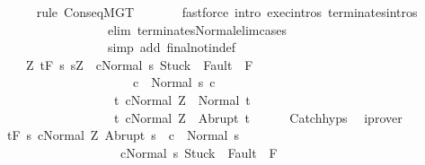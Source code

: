 \begin{isabellebody}
\ \ \ \ \isamarkupfalse%
\ {\isacharparenleft}rule\ ConseqMGT{\isacharparenright}\isanewline
\ \ \ \ \ \ \ {\isacharparenleft}fastforce\ intro{\isacharcolon}\ exec{\isachardot}intros\ terminates{\isachardot}intros\ \isanewline
\ \ \ \ \ \ \ \ \ \ \ \ \ \ \ \ \ elim{\isacharcolon}\ terminates{\isacharunderscore}Normal{\isacharunderscore}elim{\isacharunderscore}cases\isanewline
\ \ \ \ \ \ \ \ \ \ \ \ \ \ \ \ \ simp\ add{\isacharcolon}\ final{\isacharunderscore}notin{\isacharunderscore}def{\isacharparenright}\isanewline
\ \ \isamarkupfalse%
\isanewline
\ \ \isamarkupfalse%
\ \isanewline
\ \ \ \ {\isachardoublequoteopen}{\isasymforall}Z{\isachardot}\ {\isasymGamma}{\isacharcomma}{\isasymTheta}{\isasymturnstile}\isactrlsub t\isactrlbsub {\isacharslash}F\isactrlesub \ {\isacharbraceleft}s{\isachardot}\ s{\isacharequal}Z\ {\isasymand}\ {\isasymGamma}{\isasymturnstile}{\isasymlangle}cNormal\ s{\isasymrangle}\ {\isasymRightarrow}{\isasymnotin}{\isacharparenleft}{\isacharbraceleft}Stuck{\isacharbraceright}\ {\isasymunion}\ Fault\ {\isacharbackquote}\ {\isacharparenleft}{\isacharminus}F{\isacharparenright}{\isacharparenright}\ {\isasymand}\ \isanewline
\ \ \ \ \ \ \ \ \ \ \ \ \ \ \ \ \ \ \ \ \ {\isasymGamma}{\isasymturnstile}c\ {\isasymdown}\ Normal\ s{\isacharbraceright}\ c\isanewline
\ \ \ \ \ \ \ \ \ \ \ \ \ \ \ \ \ \ {\isacharbraceleft}t{\isachardot}\ {\isasymGamma}{\isasymturnstile}{\isasymlangle}cNormal\ Z{\isasymrangle}\ {\isasymRightarrow}\ Normal\ t{\isacharbraceright}{\isacharcomma}\isanewline
\ \ \ \ \ \ \ \ \ \ \ \ \ \ \ \ \ \ {\isacharbraceleft}t{\isachardot}\ {\isasymGamma}{\isasymturnstile}{\isasymlangle}cNormal\ Z{\isasymrangle}\ {\isasymRightarrow}\ Abrupt\ t{\isacharbraceright}{\isachardoublequoteclose}\isanewline
\ \ \ \ \isamarkupfalse%
\ Catch{\isachardot}hyps\ \isamarkupfalse%
\ iprover\isanewline
\ \ \isamarkupfalse%
\ {\isachardoublequoteopen}{\isasymGamma}{\isacharcomma}{\isasymTheta}{\isasymturnstile}\isactrlsub t\isactrlbsub {\isacharslash}F\isactrlesub \ {\isacharbraceleft}s{\isachardot}\ {\isasymGamma}{\isasymturnstile}{\isasymlangle}cNormal\ Z{\isasymrangle}\ {\isasymRightarrow}Abrupt\ s\ {\isasymand}\ {\isasymGamma}{\isasymturnstile}c\ {\isasymdown}\ Normal\ s\ {\isasymand}\ \isanewline
\ \ \ \ \ \ \ \ \ \ \ \ \ \ \ \ \ \ \ {\isasymGamma}{\isasymturnstile}{\isasymlangle}cNormal\ s{\isasymrangle}\ {\isasymRightarrow}{\isasymnotin}{\isacharparenleft}{\isacharbraceleft}Stuck{\isacharbraceright}\ {\isasymunion}\ Fault\ {\isacharbackquote}\ {\isacharparenleft}{\isacharminus}F{\isacharparenright}{\isacharparenright}{\isacharbraceright}\ \isanewline

\end{isabellebody}
